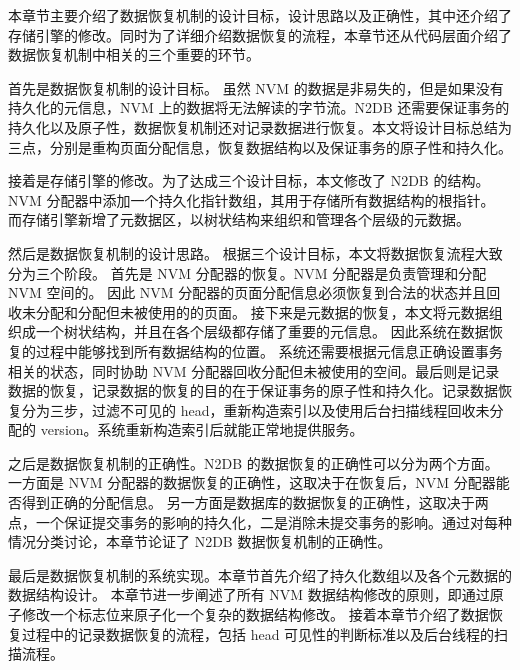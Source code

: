 本章节主要介绍了数据恢复机制的设计目标，设计思路以及正确性，其中还介绍了存储引擎的修改。同时为了详细介绍数据恢复的流程，本章节还从代码层面介绍了数据恢复机制中相关的三个重要的环节。

首先是数据恢复机制的设计目标。
虽然 NVM 的数据是非易失的，但是如果没有持久化的元信息，NVM 上的数据将无法解读的字节流。N2DB 还需要保证事务的持久化以及原子性，数据恢复机制还对记录数据进行恢复。本文将设计目标总结为三点，分别是重构页面分配信息，恢复数据结构以及保证事务的原子性和持久化。

接着是存储引擎的修改。为了达成三个设计目标，本文修改了 N2DB 的结构。NVM 分配器中添加一个持久化指针数组，其用于存储所有数据结构的根指针。
而存储引擎新增了元数据区，以树状结构来组织和管理各个层级的元数据。

然后是数据恢复机制的设计思路。
根据三个设计目标，本文将数据恢复流程大致分为三个阶段。
首先是 NVM 分配器的恢复。NVM 分配器是负责管理和分配 NVM 空间的。
因此 NVM 分配器的页面分配信息必须恢复到合法的状态并且回收未分配和分配但未被使用的的页面。
接下来是元数据的恢复，本文将元数据组织成一个树状结构，并且在各个层级都存储了重要的元信息。
因此系统在数据恢复的过程中能够找到所有数据结构的位置。
系统还需要根据元信息正确设置事务相关的状态，同时协助 NVM 分配器回收分配但未被使用的空间。最后则是记录数据的恢复，记录数据的恢复的目的在于保证事务的原子性和持久化。记录数据恢复分为三步，过滤不可见的 head，重新构造索引以及使用后台扫描线程回收未分配的 version。系统重新构造索引后就能正常地提供服务。

之后是数据恢复机制的正确性。N2DB 的数据恢复的正确性可以分为两个方面。一方面是 NVM 分配器的数据恢复的正确性，这取决于在恢复后，NVM 分配器能否得到正确的分配信息。
另一方面是数据库的数据恢复的正确性，这取决于两点，一个保证提交事务的影响的持久化，二是消除未提交事务的影响。通过对每种情况分类讨论，本章节论证了 N2DB 数据恢复机制的正确性。

最后是数据恢复机制的系统实现。本章节首先介绍了持久化数组以及各个元数据的数据结构设计。
本章节进一步阐述了所有 NVM 数据结构修改的原则，即通过原子修改一个标志位来原子化一个复杂的数据结构修改。
接着本章节介绍了数据恢复过程中的记录数据恢复的流程，包括 head 可见性的判断标准以及后台线程的扫描流程。


